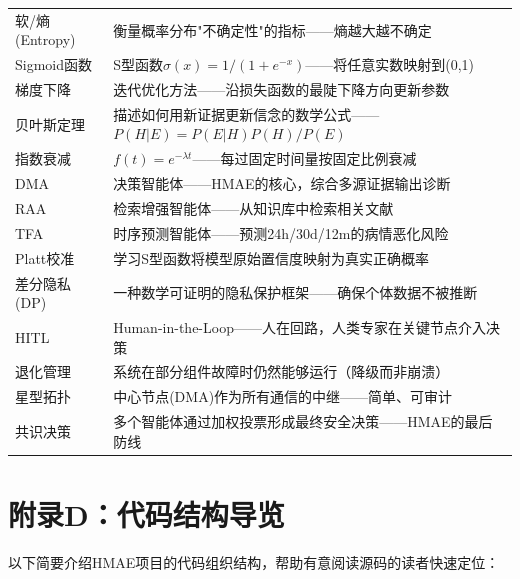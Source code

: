 \documentclass[11pt,a4paper]{ctexart}
\begin{document}
\begin{longtable}{p{3.5cm}p{10.5cm}}
软/熵 (Entropy) & 衡量概率分布"不确定性"的指标——熵越大越不确定 \\
Sigmoid函数 & S型函数$\sigma(x)=1/(1+e^{-x})$——将任意实数映射到(0,1) \\
梯度下降 & 迭代优化方法——沿损失函数的最陡下降方向更新参数 \\
贝叶斯定理 & 描述如何用新证据更新信念的数学公式——$P(H|E)=P(E|H)P(H)/P(E)$ \\
指数衰减 & $f(t)=e^{-\lambda t}$——每过固定时间量按固定比例衰减 \\
DMA & 决策智能体——HMAE的核心，综合多源证据输出诊断 \\
RAA & 检索增强智能体——从知识库中检索相关文献 \\
TFA & 时序预测智能体——预测24h/30d/12m的病情恶化风险 \\
Platt校准 & 学习S型函数将模型原始置信度映射为真实正确概率 \\
差分隐私(DP) & 一种数学可证明的隐私保护框架——确保个体数据不被推断 \\
HITL & Human-in-the-Loop——人在回路，人类专家在关键节点介入决策 \\
退化管理 & 系统在部分组件故障时仍然能够运行（降级而非崩溃） \\
星型拓扑 & 中心节点(DMA)作为所有通信的中继——简单、可审计 \\
共识决策 & 多个智能体通过加权投票形成最终安全决策——HMAE的最后防线 \\
\end{longtable}
\normalsize

\newpage

\section*{附录D：代码结构导览}

以下简要介绍HMAE项目的代码组织结构，帮助有意阅读源码的读者快速定位：
\end{document}
